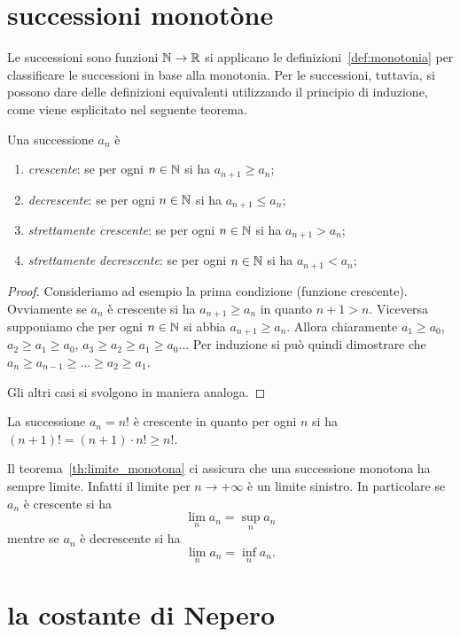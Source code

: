 \section{successioni monotòne}

Le successioni sono funzioni $\mathbb N \to \mathbb R$ si applicano 
le definizioni~\ref{def:monotonia} per
classificare le successioni in base alla monotonia.
Per le successioni, tuttavia, si possono dare delle definizioni
equivalenti utilizzando il principio di induzione,
come viene esplicitato nel seguente teorema.

\begin{theorem}
\mymark{***}
Una successione $a_n$ è
\begin{enumerate}
\item \emph{crescente}: se per ogni $n\in \mathbb N$ si ha $a_{n+1} \ge a_n$;
\item \emph{decrescente}: se per ogni $n\in \mathbb N$ si ha $a_{n+1} \le a_n$;
\item \emph{strettamente crescente}: se per ogni $n\in \mathbb N$ si ha $a_{n+1}>a_n$;
\item \emph{strettamente decrescente}: se per ogni $n\in \mathbb N$ si ha
$a_{n+1}<a_n$;
\end{enumerate}
\end{theorem}
%
\begin{proof}
  Consideriamo ad esempio la prima condizione (funzione crescente).
Ovviamente se $a_n$ è crescente si ha $a_{n+1}\ge a_n$ in quanto $n+1 > n$.
Viceversa supponiamo che per ogni $n\in \mathbb N$ si abbia $a_{n+1}\ge a_n$.  Allora
chiaramente $a_1\ge a_0$, $a_2\ge a_1 \ge a_0$, $a_3 \ge a_2 \ge a_1 \ge a_0$...
Per induzione si può quindi dimostrare che  $a_n \ge a_{n-1} \ge \dots \ge a_2
\ge a_1$.

Gli altri casi si svolgono in maniera analoga.
\end{proof}

\begin{example}
  La successione $a_n = n!$ è crescente 
  in quanto per ogni $n$ si ha $(n+1)! = (n+1)\cdot n! \ge n!$.
\end{example}

Il teorema~\ref{th:limite_monotona} ci assicura che una 
successione monotona ha sempre limite. 
Infatti il limite per $n\to +\infty$ è un limite sinistro.
In particolare se $a_n$ è crescente si ha 
\[
  \lim_n a_n = \sup_n a_n
\]
mentre se $a_n$ è decrescente si ha 
\[
  \lim_n a_n = \inf_n a_n.
\]

\section{la costante di Nepero}

